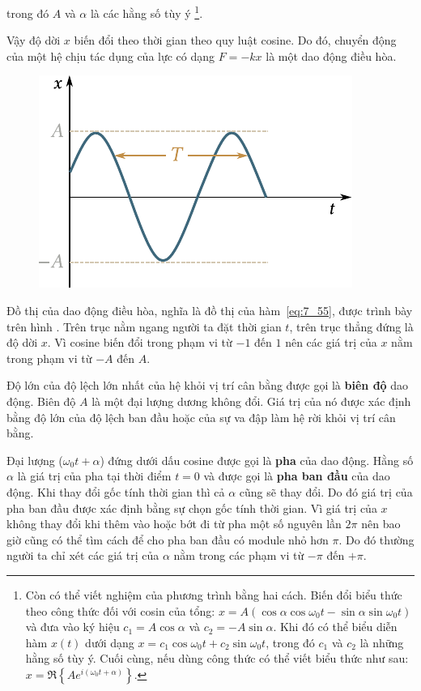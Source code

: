 \noindent
trong đó $A$ và $\alpha$ là các hằng số tùy ý \footnote{Còn có thể viết nghiệm của phương trình  bằng hai cách. Biến đổi biểu thức  theo công thức đối với cosin của tổng: $x = A(\cos\alpha\cos\omega_0 t - \sin\alpha\sin\omega_0 t)$ và đưa vào ký hiệu $c_1=A\cos\alpha$ và $c_2=-A\sin\alpha$. Khi đó có thể biểu diễn hàm $x(t)$ dưới dạng $x=c_1\cos\omega_0 t+c_2\sin\omega_0 t$, trong đó $c_1$ và $c_2$ là những hằng số tùy ý. Cuối cùng, nếu dùng công thức  có thể viết biểu thức  như sau: $x=\Re\left\{Ae^{i(\omega_0 t+\alpha)}\right\}$.}.

Vậy độ dời $x$ biến đổi theo thời gian theo quy luật cosine. Do đó, chuyển động của một hệ chịu tác dụng của lực có dạng $F=-kx$ là một dao động điều hòa.

\begin{figure}[!htb]
	\begin{center}
		\includegraphics[scale=0.95]{figures/ch_07/fig_7_4.pdf}
		\caption[]{}
		\label{fig:7_4}
	\end{center}
\end{figure}

Đồ thị của dao động điều hòa, nghĩa là đồ thị của hàm~\eqref{eq:7_55}, được trình bày trên hình . Trên trục nằm ngang người ta đặt thời gian $t$, trên trục thẳng đứng là độ dời $x$. Vì cosine biến đổi trong phạm vi từ $-1$ đến $1$ nên các giá trị của $x$ nằm trong phạm vi từ $-A$ đến $A$.

Độ lớn của độ lệch lớn nhất của hệ khỏi vị trí cân bằng được gọi là \textbf{biên độ} dao động. Biên độ $A$ là một đại lượng dương không đổi. Giá trị của nó được xác định bằng độ lớn của độ lệch ban đầu hoặc của sự va đập làm hệ rời khỏi vị trí cân bằng.

Đại lượng ($\omega_0 t+\alpha$) đứng dưới dấu cosine được gọi là \textbf{pha} của dao động. Hằng số $\alpha$ là giá trị của pha tại thời điểm $t=0$ và được gọi là \textbf{pha ban đầu} của dao động. Khi thay đổi gốc tính thời gian thì cả $\alpha$ cũng sẽ thay đổi. Do đó giá trị của pha ban đầu được xác định bằng sự chọn gốc tính thời gian. Vì giá trị của $x$ không thay đổi khi thêm vào hoặc bớt đi từ pha một số nguyên lần $2\pi$ nên bao giờ cũng có thể tìm cách để cho pha ban đầu có module nhỏ hơn $\pi$. Do đó thường người ta chỉ xét các giá trị của $\alpha$ nằm trong các phạm vi từ $-\pi$ đến $+\pi$.

